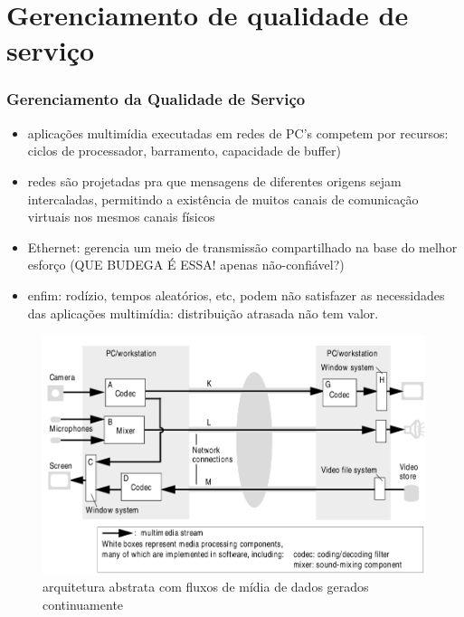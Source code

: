 \documentclass[]{beamer}
\begin{document}
\section{Gerenciamento de qualidade de serviço}

\begin{frame}
  \frametitle{Gerenciamento da Qualidade de Serviço}
\begin{itemize}
  \item aplicações multimídia executadas em redes de PC's competem por recursos: ciclos 
de processador, barramento, capacidade de buffer)
  \item redes são projetadas pra que mensagens de diferentes origens sejam intercaladas,
permitindo a existência de muitos canais de comunicação virtuais nos mesmos canais físicos
  \item Ethernet: gerencia um meio de transmissão compartilhado na base do melhor esforço
(QUE BUDEGA É ESSA! apenas não-confiável?)
  \item enfim: rodízio, tempos aleatórios, etc, podem não satisfazer as necessidades das
aplicações multimídia: distribuição atrasada não tem valor.
\end{itemize}
\end{frame}

\begin{frame}
  \begin{figure}[hbtp]
   \caption{arquitetura abstrata com fluxos de mídia de dados gerados continuamente}
   \begin{center}
    \includegraphics[scale=0.31]{arquitetura_abstrata.png}
   \end{center}
  \end{figure}
\end{frame}
\end{document}
